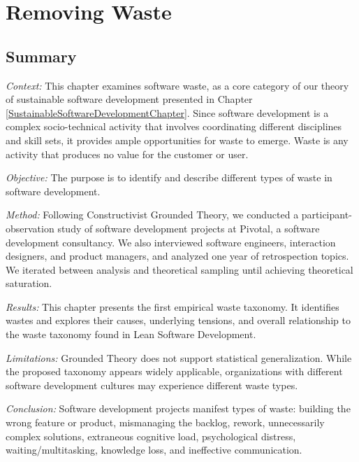 
\chapter{Removing Waste}
\label{SoftwareEngineeringWasteChapter}
\section{Summary}

\textit{Context:} This chapter examines software waste, as a core category of our theory of sustainable software development presented in Chapter \ref{SustainableSoftwareDevelopmentChapter}. Since software development is a complex socio-technical activity that involves coordinating different disciplines and skill sets, it provides ample opportunities for waste to emerge. Waste is any activity that produces no value for the customer or user.

\textit{Objective:} The purpose is to identify and describe different types of waste in software development.

\textit{Method:} Following Constructivist Grounded Theory, we conducted a \durationOfResearchStudyAdjective{} participant-observation study of \numberOfObservedProjects{} software development projects at Pivotal, a software development consultancy. We also interviewed \numberOfInterviews{} software engineers, interaction designers, and product managers, and analyzed one year of retrospection topics. We iterated between analysis and theoretical sampling until achieving theoretical saturation.

\textit{Results:} This chapter presents the first empirical waste taxonomy. It identifies \numberOfWastes{} wastes and explores their causes, underlying tensions, and overall relationship to the waste taxonomy found in Lean Software Development.

\textit{Limitations:} Grounded Theory does not support statistical generalization. While the proposed taxonomy appears widely applicable, organizations with different software development cultures may experience different waste types.

\textit{Conclusion:} Software development projects manifest \numberOfWastes{} types of waste: building the wrong feature or product, mismanaging the backlog, rework, unnecessarily complex solutions, extraneous cognitive load, psychological distress, waiting/multitasking, knowledge loss, and ineffective communication.


